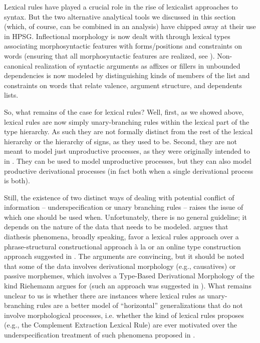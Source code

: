 \documentclass[output=paper]{langsci/langscibook}
\begin{document}
Lexical rules have played a crucial role in the rise of lexicalist approaches to syntax. But the two alternative analytical tools we discussed in this section (which, of course, can be combined in an analysis) have chipped away at their use in HPSG. Inflectional morphology is now dealt with through lexical types associating morphosyntactic features with forms/positions and constraints on words (ensuring that all morphosyntactic features are realized, see ). 
Non-canonical realization of syntactic arguments as affixes or fillers in unbounded dependencies is now modeled by distinguishing kinds of members of the  list and constraints on words that relate valence, argument structure, and dependents lists. 

So, what remains of the case for lexical rules? Well, first, as we showed above, lexical rules are now simply unary-branching rules within the lexical part of the type hierarchy. As such they are not formally distinct from the rest of the lexical hierarchy or the hierarchy of signs, as they used to be. Second, they are not meant to model just unproductive processes, as they were originally intended to in \citet{Jackendoff1975,Bochner1993}. They can be used to model unproductive processes, but they can also model productive derivational processes (in fact both when a single derivational process is both).

Still, the existence of two distinct ways of dealing with potential conflict of information -- underspecification or unary branching rules -- raises the issue of which one should be used when. Unfortunately, there is no general guideline; it depends on the nature of the data that needs to be modeled. \citet{Mueller2006,Mueller2010} argues that diathesis phenomena, broadly speaking, favor a lexical rules approach over a phrase-structural constructional approach à la \citet{Goldberg95a}  or an online type construction approach suggested in . The arguments are convincing, but it should be noted that some of the data involves derivational morphology (e.g., causatives) or passive morphemes, which involves a Type-Based Derivational Morphology of the kind Riehemann argues for (such an approach was suggested in \citet[Chapter~4]{Koenig1999c}). What remains unclear to us is whether there are instances where lexical rules as unary-branching rules are a better model of ``horizontal'' generalizations that do not involve morphological processes, i.e. whether the kind of lexical rules \citet{PollardandSag1994} proposes (e.g., the Complement Extraction Lexical Rule) are ever motivated over the  underspecification treatment of such phenomena proposed in \citet{Boumaetal2001}.
\end{document}
